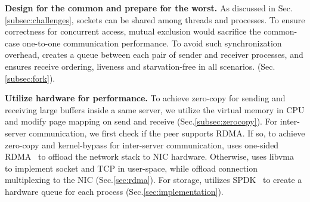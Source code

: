 \textbf{Design for the common and prepare for the worst.}
As discussed in Sec.\ref{subsec:challenges}, sockets can be shared among threads and processes. To ensure correctness for concurrent access, mutual exclusion would sacrifice the common-case one-to-one communication performance. To avoid such synchronization overhead, \libipc creates a queue between each pair of sender and receiver processes, and ensures receive ordering, liveness and starvation-free in all scenarios. (Sec.\ref{subsec:fork}).

\textbf{Utilize hardware for performance.}
To achieve zero-copy for sending and receiving large buffers inside a same server, we utilize the virtual memory in CPU and modify page mapping on send and receive (Sec.\ref{subsec:zerocopy}). For inter-server communication, we first check if the peer supports RDMA. If so, to achieve zero-copy and kernel-bypass for inter-server communication, \libipc uses one-sided RDMA~\cite{mitchell2013using} to offload the network stack to NIC hardware. Otherwise, \libipc uses libvma~\cite{libvma} to implement socket and TCP in user-space, while offload connection multiplexing to the NIC (Sec.\ref{sec:rdma}). For storage, \libipc utilizes SPDK~\cite{spdk} to create a hardware queue for each process (Sec.\ref{sec:implementation}).





